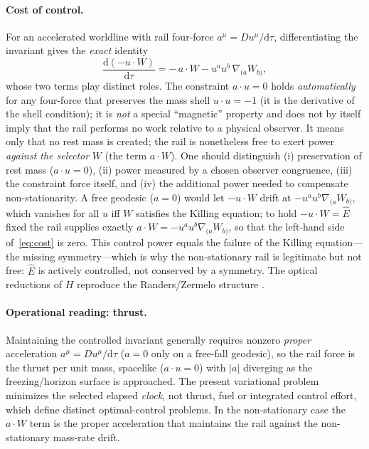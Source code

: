 \documentclass[12pt]{iopart}
\newcommand{\Ehat}{\hat E}
\newcommand{\dd}{\mathrm{d}}
\begin{document}
\paragraph{Cost of control.} For an accelerated worldline with rail four-force
$a^\mu=Du^\mu/\dd\tau$, differentiating the invariant gives the \emph{exact}
identity
\begin{equation}
    \frac{\dd(-u\cdot W)}{\dd\tau}=-\,a\cdot W-u^a u^b\,\nabla_{(a}W_{b)},
    \label{eq:cost}
\end{equation}
whose two terms play distinct roles. The constraint $a\cdot u=0$ holds
\emph{automatically} for any four-force that preserves the mass shell
$u\cdot u=-1$ (it is the derivative of the shell condition); it is \emph{not} a
special ``magnetic'' property and does not by itself imply that the rail performs no
work relative to a physical observer. It means only that no rest mass is created;
the rail is nonetheless free to exert power \emph{against the selector} $W$ (the term
$a\cdot W$). One should distinguish (i) preservation of rest mass ($a\cdot u=0$),
(ii) power measured by a chosen observer congruence, (iii) the constraint force
itself, and (iv) the additional power needed to compensate non-stationarity.
A free geodesic ($a=0$) would let $-u\cdot W$ drift at $-u^au^b\nabla_{(a}W_{b)}$,
which vanishes for all $u$ iff $W$ satisfies the Killing equation; to hold
$-u\cdot W=\Ehat$ fixed the rail supplies exactly $a\cdot W=-u^au^b\nabla_{(a}W_{b)}$,
so that the left-hand side of~\eqref{eq:cost} is zero. This control power equals the
failure of the Killing equation---the missing symmetry---which is why the
non-stationary rail is legitimate but not free: $\Ehat$ is actively controlled, not
conserved by a symmetry. The optical reductions of $H$
reproduce the Randers/Zermelo structure
\cite{GibbonsRanders2009,CaponioWind}.

\paragraph{Operational reading: thrust.} Maintaining the controlled invariant generally
requires nonzero \emph{proper} acceleration $a^\mu=Du^\mu/\dd\tau$ ($a=0$ only on a
free-fall geodesic), so the rail force is the thrust per unit mass, spacelike
($a\cdot u=0$) with $|a|$ diverging as the freezing/horizon surface is approached. The
present variational problem minimizes the selected elapsed \emph{clock}, not thrust, fuel
or integrated control effort, which define distinct optimal-control problems. In the
non-stationary case the $a\cdot W$ term is the proper acceleration that maintains the rail
against the non-stationary mass-rate drift.
\end{document}
